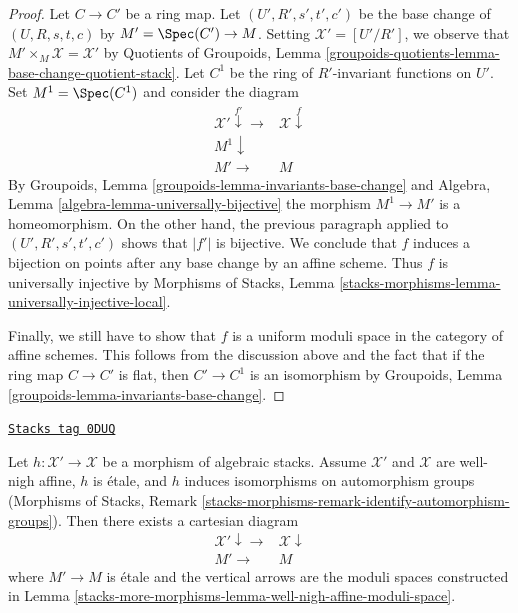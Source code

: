 \begin{proof}
\medskip\noindent
Let $C \to C'$ be a ring map. Let $(U', R', s', t', c')$ be
the base change of $(U, R, s, t, c)$ by $M' = \Spec(C') \to M$.
Setting $\mathcal{X}' = [U'/R']$, we observe that
$M' \times_M \mathcal{X} = \mathcal{X}'$ by
Quotients of Groupoids, Lemma
\ref{groupoids-quotients-lemma-base-change-quotient-stack}.
Let $C^1$ be the ring of $R'$-invariant functions on $U'$.
Set $M^1 = \Spec(C^1)$ and consider the diagram
$$
\begin{array}{cc}\mathcal{X}' \overset{f'}{\downarrow}\longrightarrow & \mathcal{X} \overset{f}{\downarrow} \\ M^1 \downarrow &  \\ M' \longrightarrow & M\end{array}
$$
By Groupoids, Lemma \ref{groupoids-lemma-invariants-base-change} and
Algebra, Lemma \ref{algebra-lemma-universally-bijective}
the morphism $M^1 \to M'$ is a homeomorphism.
On the other hand, the previous paragraph applied to
$(U', R', s', t', c')$ shows that $|f'|$ is bijective.
We conclude that $f$ induces a bijection on points after any
base change by an affine scheme. Thus $f$ is universally injective
by Morphisms of Stacks, Lemma
\ref{stacks-morphisms-lemma-universally-injective-local}.

\medskip\noindent
Finally, we still have to show that $f$ is a uniform moduli space
in the category of affine schemes. This follows from the discussion
above and the fact that if the
ring map $C \to C'$ is flat, then $C' \to C^1$ is an isomorphism
by Groupoids, Lemma \ref{groupoids-lemma-invariants-base-change}.
\end{proof}

\begin{lemma}
\label{stacks-more-morphisms-lemma-well-nigh-affine-moduli-space-etale}
\href{https://stacks.math.columbia.edu/tag/0DUQ}{\texttt{Stacks tag 0DUQ}}

Let $h : \mathcal{X}' \to \mathcal{X}$ be a morphism of algebraic stacks.
Assume $\mathcal{X}'$ and $\mathcal{X}$ are well-nigh affine,
$h$ is \'etale, and $h$ induces isomorphisms on automorphism groups
(Morphisms of Stacks, Remark
\ref{stacks-morphisms-remark-identify-automorphism-groups}).
Then there exists a cartesian diagram
$$
\begin{array}{cc}\mathcal{X}' \downarrow\longrightarrow & \mathcal{X} \downarrow \\ M' \longrightarrow & M\end{array}
$$
where $M' \to M$ is \'etale and
the vertical arrows are the moduli spaces constructed in
Lemma \ref{stacks-more-morphisms-lemma-well-nigh-affine-moduli-space}.
\end{lemma}

